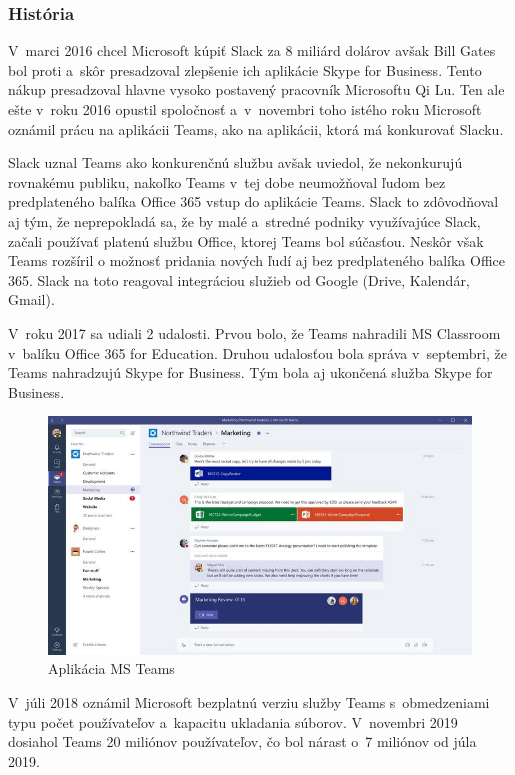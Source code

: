 \subsubsection{História}
\indent V marci 2016 chcel Microsoft kúpiť Slack za 8 miliárd dolárov avšak Bill Gates bol proti a skôr presadzoval zlepšenie ich aplikácie Skype for Business. Tento nákup presadzoval hlavne vysoko postavený pracovník Microsoftu Qi Lu. Ten ale ešte v roku 2016 opustil spoločnosť a v novembri toho istého roku Microsoft oznámil prácu na aplikácii Teams, ako na aplikácii, ktorá má konkurovať Slacku. 

\indent Slack uznal Teams ako konkurenčnú službu avšak uviedol, že nekonkurujú rovnakému publiku, nakoľko Teams v tej dobe neumožňoval ľudom bez predplateného balíka Office 365 vstup do aplikácie Teams. Slack to zdôvodňoval aj tým, že neprepokladá sa, že by malé a stredné podniky využívajúce Slack, začali používať platenú službu Office, ktorej Teams bol súčasťou. Neskôr však Teams rozšíril o možnosť pridania nových ľudí aj bez predplateného balíka Office 365. Slack na toto reagoval integráciou služieb od Google (Drive, Kalendár, Gmail). 

\indent V roku 2017 sa udiali 2 udalosti. Prvou bolo, že Teams nahradili MS Classroom v balíku Office 365 for Education. Druhou udalosťou bola správa v septembri, že Teams nahradzujú Skype for Business. Tým bola aj ukončená služba Skype for Business. 

\begin{figure}[H]
    \centering
    \includegraphics[scale=0.70]{img/obr-ms-teams.jpg}
    \caption{Aplikácia MS Teams\cite{ms_teams_2}}
    \label{fig:img-ms-teams}
\end{figure}

\indent V júli 2018 oznámil Microsoft bezplatnú verziu služby Teams s obmedzeniami typu počet používateľov a kapacitu ukladania súborov. V novembri 2019 dosiahol Teams 20 miliónov používateľov, čo bol nárast o 7 miliónov od júla 2019\cite{ms_teams}. 
